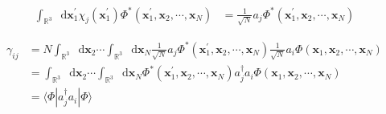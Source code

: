\documentclass[a4paper]{book}
\newcommand*{\dif}{\mathop{}\!\mathrm{d}}
\begin{document}
\begin{solution}
\begin{itemize}
	\begin{align*}
		\int_{ \mathbb{R}^3 } \dif \boldsymbol{x}^\prime_1 \chi_j( \boldsymbol{x}^\prime_1 ) \Phi^*( \boldsymbol{x}^\prime_1, \boldsymbol{x}_2, \cdots , \boldsymbol{x}_N ) &= \frac{1}{ \sqrt{N} } a_j \Phi^*( \boldsymbol{x}^\prime_1, \boldsymbol{x}_2, \cdots , \boldsymbol{x}_N ) 
	\end{align*}
		
	\begin{align*}
		\gamma_{ij} &= N \int_{ \mathbb{R}^3 } \dif \boldsymbol{x}_2 \cdots \int_{ \mathbb{R}^3 } \dif \boldsymbol{x}_N \frac{1}{ \sqrt{N} } a_j \Phi^*( \boldsymbol{x}^\prime_1, \boldsymbol{x}_2, \cdots , \boldsymbol{x}_N ) \frac{1}{ \sqrt{N} } a_i \Phi( \boldsymbol{x}_1, \boldsymbol{x}_2, \cdots , \boldsymbol{x}_N ) \\
		&= \int_{ \mathbb{R}^3 } \dif \boldsymbol{x}_2 \cdots \int_{ \mathbb{R}^3 } \dif \boldsymbol{x}_N  \Phi^*( \boldsymbol{x}^\prime_1, \boldsymbol{x}_2, \cdots , \boldsymbol{x}_N ) a^\dagger_j a_i \Phi( \boldsymbol{x}_1, \boldsymbol{x}_2, \cdots , \boldsymbol{x}_N ) \\
		&= \langle \Phi | a^\dagger_j a_i | \Phi \rangle
	\end{align*}
	
	
	\end{itemize}		
	
	\end{solution}
	
\end{document}
